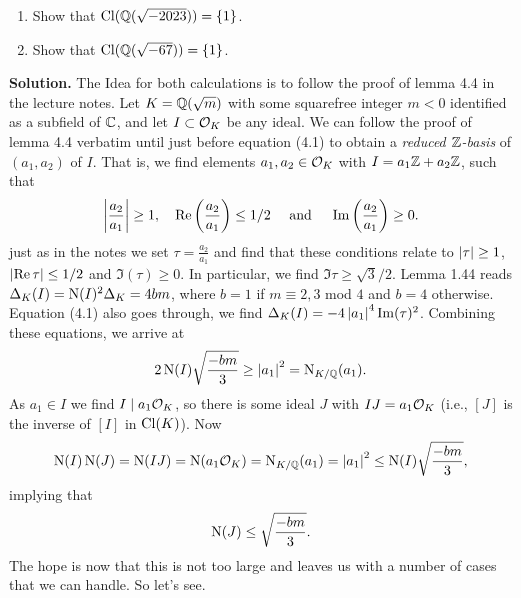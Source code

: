 \documentclass[a4paper,11pt]{article}
\begin{document}
\begin{enumerate}
    \item Show that $\operatorname{Cl}(\mathbb{Q}(\sqrt{-2023})) = \{1\}$.
    \item Show that $\operatorname{Cl}(\mathbb{Q}(\sqrt{-67})) = \{1\}$.
\end{enumerate}
\textbf{Solution.}
The Idea for both calculations is to follow the proof of lemma 4.4 in the lecture
notes. Let $K = \mathbb{Q}(\sqrt m)$ with some squarefree integer $m<0$ identified as a
subfield of $\mathbb{C}$, and let $I \subset \mathcal{O}_K$ be any ideal. We can follow the
proof of lemma 4.4 verbatim until just before equation (4.1) to obtain a
\emph{reduced $\mathbb{Z}$-basis} of $(a_1, a_2)$ of $I$. That is, we find elements
$a_1, a_2 \in \mathcal{O}_K$ with $I = a_1 \mathbb{Z} + a_2 \mathbb{Z}$, such that 
\begin{equation*}
    \left\lvert \frac {a_2}{a_1} \right\rvert \geq 1, \quad \operatorname{Re}\left(\frac{a_2}{a_1} \right) \leq 1/2
    \quad \text{ and } \quad \operatorname{Im}\left(\frac{a_2}{a_1} \right) \geq 0.
\end{equation*}
just as in the notes we set $\tau = \frac {a_2}{a_1}$ and find that these conditions
relate to $\left\lvert \tau \right\rvert \geq 1$, $\left\lvert \operatorname{Re} \tau \right\rvert \leq 1/2$ and 
$\Im(\tau) \geq 0$. In particular, we find $\Im \tau \geq \sqrt 3 /2$. 
Lemma 1.44 reads $\Delta_K(I) = \operatorname{N}(I)^2\Delta_K = 4bm$, where $b=1$ if 
$m \equiv 2,3$ mod $4$ and $b=4$ otherwise. 
Equation (4.1) also goes through, we find $\Delta_K(I) = -4 \left\lvert a_1 \right\rvert^4 \operatorname{Im}(\tau)^2$.
Combining these equations, we arrive at 
\begin{equation*}
    2\operatorname{N}(I) \sqrt{\frac{-bm}3} \geq \left\lvert a_1 \right\rvert^2 = \operatorname{N}_{K/\mathbb{Q}}(a_1).
\end{equation*}
As $a_1 \in I$ we find $I \mid a_1 \mathcal{O}_K$, so there is some ideal $J$ with
$IJ = a_1 \mathcal{O}_K$ (i.e., $[J]$ is the inverse of $[I]$ in $\operatorname{Cl}(K)$). Now
\begin{equation*}
    \operatorname{N}(I) \operatorname{N}(J) = \operatorname{N}(IJ) = \operatorname{N}(a_1 \mathcal{O}_K) = \operatorname{N}_{K/\mathbb{Q}}(a_1) = \left\lvert a_1 \right\rvert^2 
    \leq \operatorname{N}(I) \sqrt{\frac{-bm}3},
\end{equation*}
implying that 
\begin{equation*}
    \operatorname{N}(J) \leq \sqrt{\frac{-bm}3}.
\end{equation*}
The hope is now that this is not too large and leaves us with a number of cases 
that we can handle. So let's see.
\end{document}
